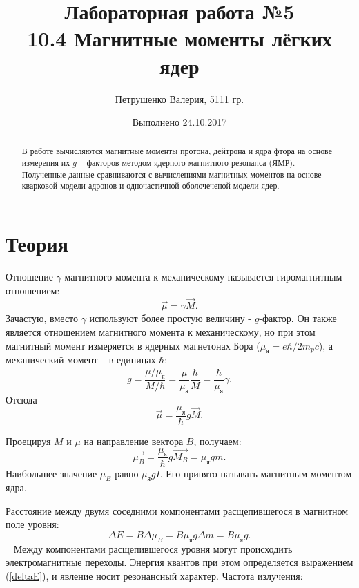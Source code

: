 \documentclass[12pt,a4paper]{article}
\title{\textbf{Лабораторная работа №5}\vspace{3mm} \\ 10.4 Магнитные моменты лёгких ядер}
\author{Петрушенко Валерия, 5111 гр.}
\date{Выполнено 24.10.2017}
\begin{document}
\maketitle
\renewcommand{\abstractname}{\vspace{-\baselineskip}}

\begin{abstract}
	В работе вычисляются магнитные моменты протона, дейтрона и ядра фтора на основе измерения их $g-$факторов методом ядерного магнитного резонанса (ЯМР). Полученные данные сравниваются с вычислениями магнитных моментов на основе кварковой модели адронов и одночастичной оболочеченой модели  ядер.
	
\end{abstract}

\section{Теория}

Отношение $\gamma$ магнитного момента к механическому называется гиромагнитным отношением:
\begin{equation}
\vec{\mu} = \gamma \vec{M}.
\end{equation}
Зачастую, вместо $\gamma$ используют более простую величину - $g$-фактор. Он также является отношением магнитного момента к механическому, но при этом магнитный момент измеряется в ядерных магнетонах Бора ($\mu_\text{я} = e \hbar / 2 m_p c$), а механический момент -- в единицах $\hbar$:
\begin{equation}
g = \frac{\mu / \mu _\text{я}}{M/\hbar} = \frac{\mu}{\mu_\text{я}} \frac{\hbar}{M} = \frac{\hbar}{\mu_\text{я}} \gamma.
\end{equation}
Отсюда 
\begin{equation} \label{mu}
\vec{\mu} = \frac{\mu_\text{я}}{\hbar} g \vec{M}.
\end{equation}


Проецируя $M$ и $\mu$ на направление вектора $B$, получаем:
\begin{equation}
\vec{\mu_B} = \frac{\mu_\text{я}}{\hbar} g \vec{M_B} = \mu_\text{я} g m.
\end{equation}
Наибольшее значение $\mu_B$ равно $\mu_\text{я} g I$. Его принято называть магнитным моментом ядра. 

Расстояние между двумя соседними компонентами расщепившегося в магнитном поле уровня:
\begin{equation} \label{deltaE}
\Delta E = B \Delta \mu_B = B \mu_\text{я} g \Delta m = B \mu_\text{я} g.
\end{equation}
~
Между компонентами расщепившегося уровня могут происходить электромагнитные переходы. Энергия квантов при этом определяется выражением (\ref{deltaE}), и явление носит резонансный характер. Частота излучения:
\end{document}
